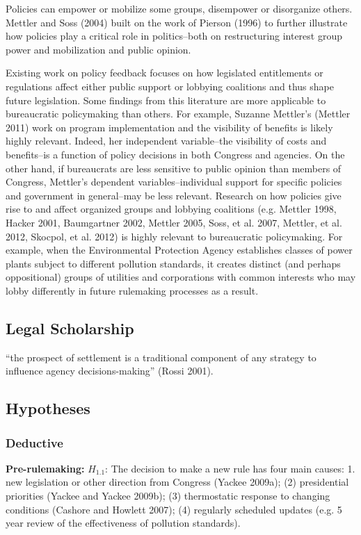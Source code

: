 Policies can empower or mobilize some groups, disempower or disorganize others. Mettler and Soss (2004) built on the work of Pierson (1996) to further illustrate how policies play a critical role in politics--both on restructuring interest group power and mobilization and public opinion.

Existing work on policy feedback focuses on how legislated entitlements or regulations affect either public support or lobbying coalitions and thus shape future legislation. Some findings from this literature are more applicable to bureaucratic policymaking than others. For example, Suzanne Mettler's (Mettler 2011) work on program implementation and the visibility of benefits is likely highly relevant. Indeed, her independent variable--the visibility of costs and benefits--is a function of policy decisions in both Congress and agencies. On the other hand, if bureaucrats are less sensitive to public opinion than members of Congress, Mettler's dependent variables--individual support for specific policies and government in general--may be less relevant. Research on how policies give rise to and affect organized groups and lobbying coalitions (e.g. Mettler 1998, Hacker 2001, Baumgartner 2002, Mettler 2005, Soss, et al. 2007, Mettler, et al. 2012, Skocpol, et al. 2012) is highly relevant to bureaucratic policymaking. For example, when the Environmental Protection Agency establishes classes of power plants subject to different pollution standards, it creates distinct (and perhaps oppositional) groups of utilities and corporations with common interests who may lobby differently in future rulemaking processes as a result. 

\subsection{Legal Scholarship}

``the prospect of settlement is a traditional component of any strategy to influence agency decisions-making'' (Rossi 2001).


\subsection{Hypotheses}

\subsubsection{Deductive}

\textbf{Pre-rulemaking:}
$H_{1.1}$: The decision to make a new rule has four main causes: 1. new legislation or other direction from Congress (Yackee 2009a); (2) presidential priorities (Yackee and Yackee 2009b); (3) thermostatic response to changing conditions (Cashore and Howlett 2007); (4) regularly scheduled updates (e.g. 5 year review of the effectiveness of pollution standards). 

